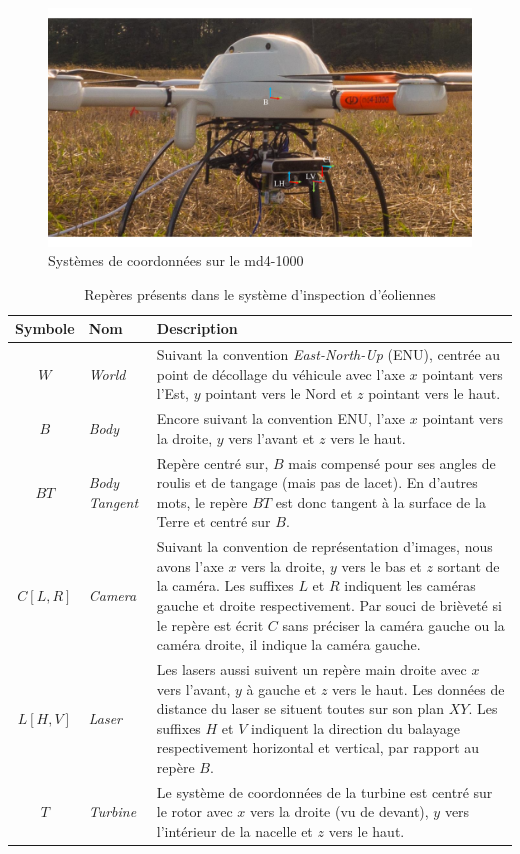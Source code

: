 \begin{figure}[htp]
  \centering
  \includegraphics[width=0.95\linewidth]{images/md41000}
  \caption{Systèmes de coordonnées sur le md4-1000}
  \label{fig:md41000}
\end{figure}

\begin{table}[htp]
  \centering
  \setlength{\tabcolsep}{12pt}
  \begin{tabular}[htp]{|c|l|p{10cm}|}
    \hline
    Symbole & Nom                   & Description\\\hline
    $W$     &  \textit{World}       & Suivant la convention \textit{East-North-Up} (ENU), centrée au point de décollage du véhicule avec l'axe $x$ pointant vers l'Est, $y$ pointant vers le Nord et $z$ pointant vers le haut.\\ \hline
    $B$     &  \textit{Body}        & Encore suivant la convention ENU, l'axe $x$ pointant vers la droite, $y$ vers l'avant et $z$ vers le haut. \\ \hline
    $\mathit{BT}$  &  \textit{Body Tangent} & Repère centré sur, $B$ mais compensé pour ses angles de roulis et de tangage (mais pas de lacet). En d'autres mots, le repère ${BT}$ est donc tangent à la surface de la Terre et centré sur $B$. \\ \hline
    $\mathit{C[L,R]}$ & \textit{Camera} & Suivant la convention de représentation d'images, nous avons l'axe $x$ vers la droite, $y$ vers le bas et $z$ sortant de la caméra. Les suffixes $L$ et $R$ indiquent les caméras gauche et droite respectivement. Par souci de brièveté si le repère est écrit $C$ sans préciser la caméra gauche ou la caméra droite, il indique la caméra gauche.   \\ \hline
    $\mathit{L[H,V]}$ & \textit{Laser}& Les lasers aussi suivent un repère main droite avec $x$ vers l'avant, $y$ à gauche et $z$ vers le haut. Les données de distance du laser se situent toutes sur son plan $XY$. Les suffixes $H$ et $V$ indiquent la direction du balayage respectivement horizontal et vertical, par rapport au repère $B$. \\ \hline
    $\mathit{T}$ & \textit{Turbine} & Le système de coordonnées de la turbine est centré sur le rotor avec $x$ vers la droite (vu de devant), $y$ vers l'intérieur de la nacelle et $z$ vers le haut. \\ \hline
  \end{tabular}
  \setlength{\tabcolsep}{6pt}
  \caption{Repères présents dans le système d'inspection d'éoliennes}
  \label{table:coordinate_frames}
\end{table}

